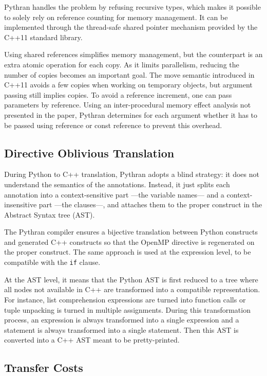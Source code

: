 \documentclass[conference]{IEEEtran}
\begin{document}
Pythran handles the problem by refusing recursive types, which makes it possible
to solely rely on reference counting for memory management. It can be
implemented through the thread-safe shared pointer mechanism provided by the
C++11 standard library.

Using shared references simplifies memory management, but the counterpart is an
extra atomic operation for each copy.
As it limits parallelism, reducing the number of copies becomes an important
goal.
The move semantic introduced in
C++11 avoids a few copies when working on temporary objects, but argument
passing still implies copies. To avoid a reference increment, one can pass
parameters by reference. Using an inter-procedural memory effect analysis not
presented in the paper, Pythran determines for each argument whether it has to
be passed using reference or const reference to prevent this overhead.

\subsection{Directive Oblivious Translation}

During Python to C++ translation, Pythran adopts a blind strategy: it does not
understand the semantics of the annotations. Instead, it just splits each
annotation into a context-sensitive part ---the variable names--- and a
context-insensitive part ---the clauses---, and attaches them to the proper
construct in the Abstract Syntax tree (AST).

The Pythran compiler ensures a bijective translation between Python constructs
and generated C++ constructs so that the OpenMP directive is regenerated on the
proper construct.
The same approach is used at the expression level, to be
compatible with the \texttt{if} clause.

At the AST level, it means that the Python AST is first reduced to a tree where
all nodes not available in C++ are transformed into a compatible representation.
For instance, list comprehension expressions are turned into function calls or
tuple unpacking is turned in multiple assignments. During this transformation
process, an expression is always transformed into a single expression and a
statement is always transformed into a single statement. Then this AST is
converted into a C++ AST meant to be pretty-printed.


\subsection{Transfer Costs}
\end{document}
